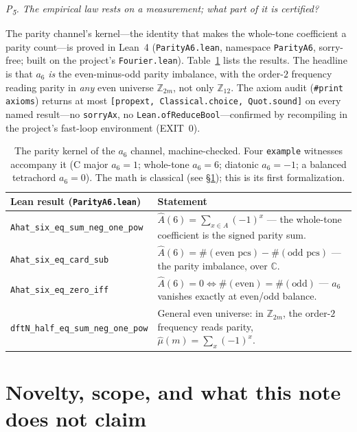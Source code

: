 \documentclass[11pt]{article}
\newcommand{\lean}[1]{\texttt{#1}}
\newcommand{\Ztwelve}{\mathbb{Z}_{12}}
\newcommand{\Zn}[1]{\mathbb{Z}_{#1}}
\newcommand{\Ahat}{\hat{A}}
\newcommand{\question}[1]{\smallskip\noindent\textit{#1}\smallskip}
\begin{document}
\question{P\textsubscript{5}. The empirical law rests on a measurement; what part of it is certified?}

The parity channel's kernel---the identity that makes the whole-tone coefficient a parity count---is proved
in Lean~4 (\lean{ParityA6.lean}, namespace \lean{ParityA6}, sorry-free; built on the project's
\lean{Fourier.lean}). Table~\ref{tab:lean} lists the results. The headline is that $a_6$ \emph{is} the
even-minus-odd parity imbalance, with the order-$2$ frequency reading parity in \emph{any} even universe
$\Zn{2m}$, not only $\Ztwelve$. The axiom audit (\lean{\#print axioms}) returns at most
\lean{[propext, Classical.choice, Quot.sound]} on every named result---no \lean{sorryAx}, no
\lean{Lean.ofReduceBool}---confirmed by recompiling in the project's fast-loop environment (EXIT~0).

\begin{table}[H]
\centering\small
{}
\begin{tabular}{@{}l p{}@{}}
\toprule
\rowcolor{ctA!22}
\textbf{Lean result (\lean{ParityA6.lean})} & \textbf{Statement}\\
\midrule
\lean{Ahat\_six\_eq\_sum\_neg\_one\_pow} & $\Ahat(6)=\sum_{x\in A}(-1)^{x}$ --- the whole-tone coefficient is the signed parity sum.\\
\lean{Ahat\_six\_eq\_card\_sub} & $\Ahat(6)=\#(\text{even pcs})-\#(\text{odd pcs})$ --- the parity imbalance, over $\mathbb{C}$.\\
\lean{Ahat\_six\_eq\_zero\_iff} & $\Ahat(6)=0\iff \#(\text{even})=\#(\text{odd})$ --- $a_6$ vanishes exactly at even/odd balance.\\
\lean{dftN\_half\_eq\_sum\_neg\_one\_pow} & General even universe: in $\Zn{2m}$, the order-$2$ frequency reads parity, $\hat\mu(m)=\sum_x(-1)^{x}$.\\
\bottomrule
\end{tabular}
\caption{The parity kernel of the $a_6$ channel, machine-checked. Four \lean{example} witnesses accompany
it (C major $a_6=1$; whole-tone $a_6=6$; diatonic $a_6=-1$; a balanced tetrachord $a_6=0$). The math is
classical (see \S\ref{sec:novelty}); this is its first formalization.}
\label{tab:lean}
\end{table}

\section{Novelty, scope, and what this note does not claim}\label{sec:novelty}
\end{document}
